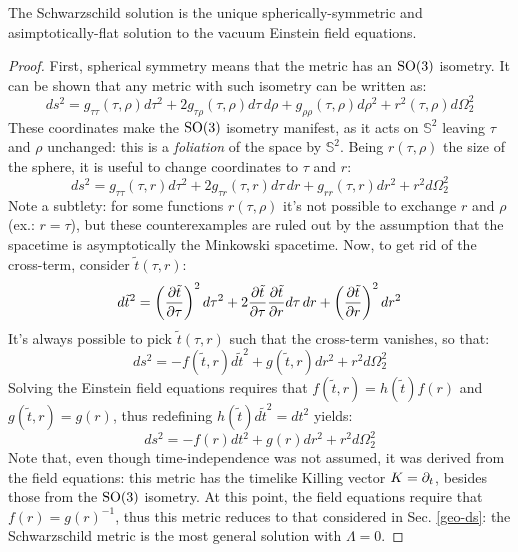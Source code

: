 \begin{theorem}[Birkhoff]
  The Schwarzschild solution is the unique spherically-symmetric and asimptotically-flat solution to the vacuum Einstein field equations.
\end{theorem}
\begin{proof}
  First, spherical symmetry means that the metric has an $ \mathrm{SO}(3) $ isometry. It can be shown that any metric with such isometry can be written as:
  \begin{equation*}
    ds^2 = g_{\tau \tau}(\tau, \rho) d\tau^2 + 2 g_{\tau \rho}(\tau, \rho) d\tau\,d\rho + g_{\rho \rho}(\tau, \rho) d\rho^2 + r^2(\tau, \rho) d\Omega_2^2
  \end{equation*}
  These coordinates make the $ \mathrm{SO}(3) $ isometry manifest, as it acts on $ \mathbb{S}^2 $ leaving $ \tau $ and $ \rho $ unchanged: this is a \textit{foliation} of the space by $ \mathbb{S}^2 $. Being $ r(\tau,\rho) $ the size of the sphere, it is useful to change coordinates to $ \tau $ and $ r $:
  \begin{equation*}
    ds^2 = g_{\tau \tau}(\tau,r) d\tau^2 + 2g_{\tau r}(\tau,r) d\tau\,dr + g_{rr}(\tau,r) dr^2 + r^2 d\Omega_2^2
  \end{equation*}
  Note a subtlety: for some functions $ r(\tau,\rho) $ it's not possible to exchange $ r $ and $ \rho $ (ex.: $ r = \tau $), but these counterexamples are ruled out by the assumption that the spacetime is asymptotically the Minkowski spacetime. Now, to get rid of the cross-term, consider $ \tilde{t}(\tau,r) $:
  \begin{equation*}
    d\tilde{t}^2 = \left( \frac{\partial \tilde{t}}{\partial \tau} \right)^2 d\tau^2 + 2 \frac{\partial \tilde{t}}{\partial \tau} \frac{\partial \tilde{t}}{\partial r} d\tau\,dr + \left( \frac{\partial \tilde{t}}{\partial r} \right)^2 dr^2
  \end{equation*}
  It's always possible to pick $ \tilde{t}(\tau,r) $ such that the cross-term vanishes, so that:
  \begin{equation*}
    ds^2 = - f(\tilde{t},r) d\tilde{t}^2 + g(\tilde{t},r) dr^2 + r^2 d\Omega_2^2
  \end{equation*}
  Solving the Einstein field equations requires that $ f(\tilde{t},r) = h(\tilde{t}) f(r) $ and $ g(\tilde{t},r) = g(r) $, thus redefining $ h(\tilde{t}) d\tilde{t}^2 = dt^2 $ yields:
  \begin{equation*}
    ds^2 = - f(r) dt^2 + g(r) dr^2 + r^2 d\Omega_2^2
  \end{equation*}
  Note that, even though time-independence was not assumed, it was derived from the field equations: this metric has the timelike Killing vector $ K = \partial_t $, besides those from the $ \mathrm{SO}(3) $ isometry. At this point, the field equations require that $ f(r) = g(r)^{-1} $, thus this metric reduces to that considered in Sec. \ref{geo-ds}: the Schwarzschild metric is the most general solution with $ \Lambda = 0 $.
\end{proof}


